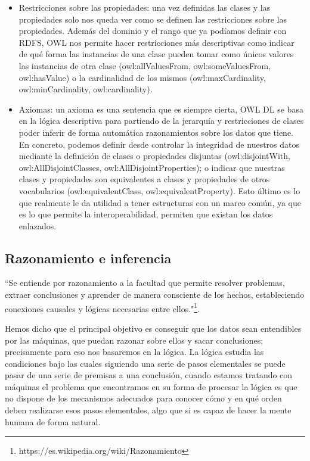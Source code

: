 \begin{itemize}
\begin{itemize}
	\end{itemize}
	\item Restricciones sobre las propiedades: una vez definidas las clases y las propiedades solo nos queda ver como se definen las restricciones sobre las propiedades. Además del dominio y el rango que ya podíamos definir con RDFS, OWL nos permite hacer restricciones más descriptivas como indicar de qué forma las instancias de una clase pueden tomar como únicos valores las instancias de otra clase (owl:allValuesFrom, owl:someValuesFrom, owl:hasValue) o la cardinalidad de los mismos (owl:maxCardinality, owl:minCardinality, owl:cardinality).
	\item Axiomas: un axioma es una sentencia que es siempre cierta, OWL DL se basa en la lógica descriptiva para partiendo de la jerarquía y restricciones de clases poder inferir de forma automática razonamientos sobre los datos que tiene. En concreto, podemos definir desde controlar la integridad de nuestros datos mediante la definición de clases o propiedades disjuntas (owl:disjointWith, owl:AllDisjointClasses, owl:AllDisjointProperties); o indicar que nuestras clases y propiedades son equivalentes a clases y propiedades de otros vocabularios (owl:equivalentClass, owl:equivalentProperty). Esto último es lo que realmente le da utilidad a tener estructuras con un marco común, ya que es lo que permite la interoperabilidad, permiten que existan los datos enlazados.
\end{itemize}

\subsection{Razonamiento e inferencia}

``Se entiende por razonamiento a la facultad que permite resolver problemas, extraer conclusiones y aprender de manera consciente de los hechos, estableciendo conexiones causales y lógicas necesarias entre ellos."\footnote{https://es.wikipedia.org/wiki/Razonamiento}.

\bigskip
Hemos dicho que el principal objetivo es conseguir que los datos sean entendibles por las máquinas, que puedan razonar sobre ellos y sacar conclusiones; precisamente para eso nos basaremos en la lógica. La lógica estudia las condiciones bajo las cuales siguiendo una serie de pasos elementales se puede pasar de una serie de premisas a una conclusión, cuando estamos tratando con máquinas el problema que encontramos en su forma de procesar la lógica es que no dispone de los mecanismos adecuados para conocer cómo y en qué orden deben realizarse esos pasos elementales, algo que si es capaz de hacer la mente humana de forma natural. 

